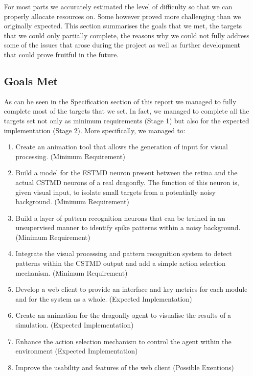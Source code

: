 \documentclass[a4paper,11pt]{article}
\begin{document}
For most parts we accurately estimated the level of difficulty so that we can properly allocate 
resources on. Some however proved more challenging than we originally expected. This section 
summarises the goals that we met, the targets that we could only partially complete, the reasons
why we could not fully address some of the issues that arose during the project as well as further
development that could prove fruitful in the future.

\subsection{Goals Met}

As can be seen in the Specification section of this report we managed to fully complete most of the 
targets that we set. In fact, we managed to complete all the targets set not only as minimum 
requirements (Stage 1) but also for the expected implementation (Stage 2). More specifically, we 
managed to:

\begin{enumerate}

 \item{Create an animation tool that allows the generation of input for visual processing. (Minimum 
Requirement)}

\item{Build a model for the ESTMD neuron present between the retina and the actual CSTMD 
neurons of a real dragonfly. The function of this neuron is, given visual input, to isolate small targets 
from a potentially noisy background. (Minimum Requirement)}  

\item{Build a layer of pattern recognition neurons that can be trained in an unsupervised manner to 
identify spike patterns within a noisy background. (Minimum Requirement)}

\item{Integrate the visual processing and pattern recognition system to detect patterns within the
CSTMD output and add a simple action selection mechanism. (Minimum Requirement)}

\item{Develop a web client to provide an interface and key metrics for each module and for the 
system as a whole.  (Expected Implementation)}

\item{Create an animation for the dragonfly agent to visualise the results of a simulation. (Expected 
Implementation)}

\item{Enhance the action selection mechanism to control the agent within the environment 
(Expected Implementation)}

\item{Improve the usability and features of the web client (Possible Exentions)}

\end{enumerate}
\end{document}
